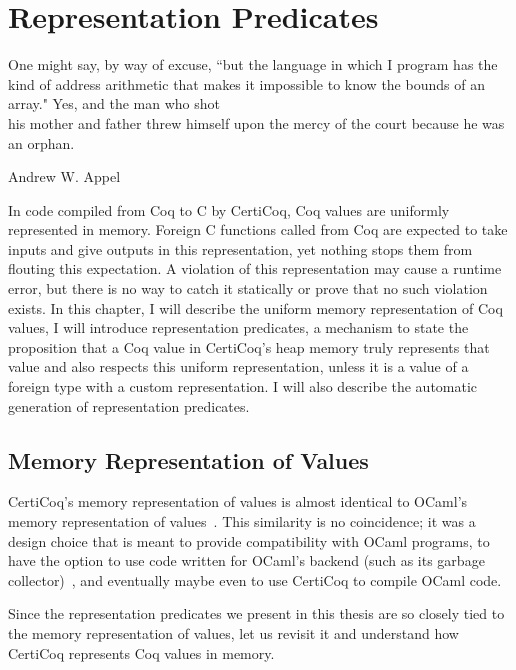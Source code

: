 \chapter{Representation Predicates}
\label{predicates}

\epigraph{One might say, by way of excuse, ``but the language in which I program has the kind of address arithmetic that makes it impossible to know the bounds of an array." Yes, and the man who shot\\his mother and father threw himself upon the mercy of the court because he was an orphan.}{Andrew W. Appel~\cite{appel1998modern}}

In code compiled from Coq to C by CertiCoq, Coq values are uniformly represented in memory. Foreign C functions called from Coq are expected to take inputs and give outputs in this representation, yet nothing stops them from flouting this expectation. A violation of this representation may cause a runtime error, but there is no way to catch it statically or prove that no such violation exists. In this chapter, I will describe the uniform memory representation of Coq values, I will introduce representation predicates, a mechanism to state the proposition that a Coq value in CertiCoq's heap memory truly represents that value and also respects this uniform representation, unless it is a value of a \gls{foreign type} with a custom representation. I will also describe the automatic generation of representation predicates. 

\section{Memory Representation of Values}
\label{memoryrepresentation}

CertiCoq's memory representation of values is almost identical to OCaml's memory representation of values~\cite{madhavapeddy2022real}. This similarity is no coincidence; it was a design choice that is meant to provide compatibility with OCaml programs, to have the option to use code written for OCaml's backend (such as its garbage collector)~\cite{certicoq}, and eventually maybe even to use CertiCoq to compile OCaml code.

Since the representation predicates we present in this thesis are so closely tied to the memory representation of values, let us revisit it and understand how CertiCoq represents Coq values in memory.

